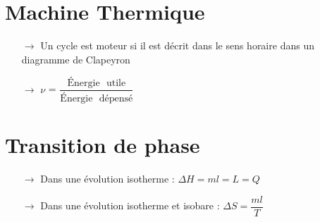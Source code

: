 \documentclass[a4paper,12pt,oneside]{report}
\begin{document}
\section{Machine Thermique}
\begin{itemize}
 \item[$\rightarrow$] Un cycle est moteur si il est décrit dans le sens horaire dans un diagramme de Clapeyron 
 \item[$\rightarrow$] $\nu$ = $\dfrac{\mbox{Énergie~ utile}}{\mbox{Énergie~ dépensé}}$
\end{itemize}
\section{Transition de phase}
\begin{itemize}
 \item[$\rightarrow$] Dans une évolution isotherme : $\Delta H = ml = L= Q$
 \item[$\rightarrow$] Dans une évolution isotherme et isobare : $\Delta S = \dfrac{ml}{T}$
\end{itemize}
\end{document}
